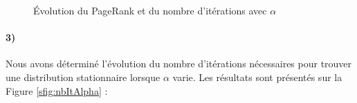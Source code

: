 \documentclass[a4paper,titlepage]{report}
\begin{document}
\begin{figure}[h]
	\center
	\caption{Évolution du PageRank et du nombre d'itérations avec $\alpha$}
\end{figure}
\paragraph{3)}
Nous avons déterminé l'évolution du nombre d'itérations nécessaires pour trouver une distribution stationnaire lorsque $\alpha$ varie. Les résultats sont présentés sur la Figure \ref{sfig:nbItAlpha} :  
\end{document}
